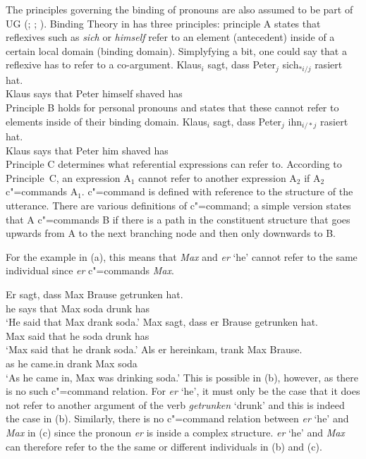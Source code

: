 The principles governing the binding of pronouns are also assumed to be part of UG (\citealp[]{Chomsky98a-u}; \citealp*[]{CTK2009a}; 
\citealp[]{Rizzi2009a}). Binding Theory in \gbt has three principles: principle A states that reflexives such as \emph{sich} or \emph{himself} refer to
an element (antecedent) inside of a certain local domain (binding domain). Simplyfying a bit, one could say
that a reflexive has to refer to a co-argument.
\ea
\gll Klaus$_i$ sagt, dass Peter$_j$ sich$_{*i/j}$ rasiert hat.\\
     Klaus     says that Peter himself shaved has\\
\z
Principle B holds for personal pronouns and states that these cannot refer to elements inside of their
binding domain.
\ea
\gll Klaus$_i$ sagt, dass Peter$_j$ ihn$_{i/*j}$ rasiert hat.\\
	 Klaus says that Peter him shaved has\\ 
\z
Principle C determines what referential expressions can refer to. According to Principle~C, an expression A$_1$ cannot refer to another expression
A$_2$ if A$_2$ c"=commands A$_1$. c"=command is defined with reference to the structure of the utterance. There are various definitions
of c"=command; a simple version states that A c"=commands B if there is a path in the constituent structure that goes upwards from A to the next branching
node and then only downwards to B.

For the example in (a), this means that \emph{Max} and \emph{er} `he' cannot refer to the same individual since \emph{er} c"=commands
\emph{Max}.

\eal
\ex 
\gll Er sagt, dass Max Brause getrunken hat.\\
	 he says that Max soda drunk has\\
\glt `He said that Max drank soda.'
\ex 
\gll Max sagt, dass er Brause getrunken hat.\\
	 Max said that he soda drunk has\\
\glt `Max said that he drank soda.'
\ex 
\gll Als er hereinkam, trank Max Brause.\\
	 as he came.in drank Max soda\\
\glt `As he came in, Max was drinking soda.'
\zl
This is possible in (b), however, as there is no such c"=command relation. For \emph{er} `he', it must only be the case that it does not
refer to another argument of the verb \emph{getrunken} `drunk' and this is indeed the case in (b). Similarly, there is no c"=command
relation between \emph{er} `he' and \emph{Max} in (c) since the pronoun \emph{er} is inside a complex structure.
\emph{er} `he' and \emph{Max} can therefore refer to the the same or different individuals in (b) and (c).

